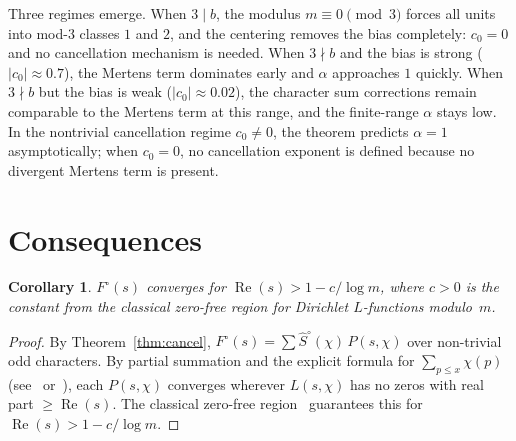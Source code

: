 \documentclass[12pt]{amsart}
\newtheorem{corollary}[theorem]{Corollary}
\theoremstyle{definition}
\theoremstyle{remark}
\begin{document}
Three regimes emerge. When $3 \mid b$, the modulus
$m \equiv 0 \pmod{3}$ forces all units into mod-$3$
classes $1$ and $2$, and the centering removes the
bias completely: $c_0 = 0$ and no cancellation mechanism
is needed. When $3 \nmid b$ and the bias is strong
($|c_0| \approx 0.7$), the Mertens term dominates
early and $\alpha$ approaches $1$ quickly. When $3 \nmid b$
but the bias is weak ($|c_0| \approx 0.02$), the
character sum corrections remain comparable to the
Mertens term at this range, and the finite-range
$\alpha$ stays low. In the nontrivial cancellation
regime $c_0 \ne 0$, the theorem predicts
$\alpha = 1$ asymptotically; when $c_0 = 0$, no
cancellation exponent is defined because no divergent
Mertens term is present.

\section{Consequences}

\begin{corollary}
$F^{\circ}(s)$ converges for
$\operatorname{Re}(s) > 1 - c/\log m$, where $c > 0$
is the constant from the classical zero-free region
for Dirichlet $L$-functions modulo~$m$.
\end{corollary}

\begin{proof}
By Theorem~\ref{thm:cancel}, $F^{\circ}(s) = \sum
\hat{S}^{\circ}(\chi)\, P(s, \chi)$ over non-trivial
odd characters. By partial summation and the explicit
formula for $\sum_{p \le x} \chi(p)$
(see~\cite[Ch.~20]{davenport}
or~\cite[Ch.~13]{montgomery}), each $P(s, \chi)$
converges wherever $L(s, \chi)$ has no zeros with real
part $\ge \operatorname{Re}(s)$. The classical zero-free
region~\cite{davenport,montgomery} guarantees this
for $\operatorname{Re}(s) > 1 - c/\log m$.
\end{proof}
\end{document}
